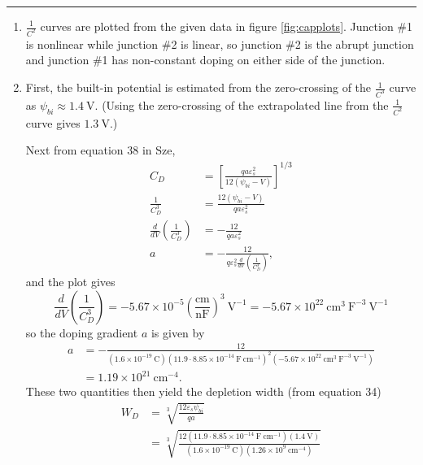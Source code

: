 \documentclass{article}
\newcommand{\horline}
           {\begin{center}
              \noindent\rule{8cm}{0.4pt}
            \end{center}}
\begin{document}
\horline
\begin{enumerate}
  \item{$\frac{1}{C^2}$ curves are plotted from the given data in figure 
        \ref{fig:capplots}. Junction \#1 is nonlinear while junction \#2 is 
        linear, so junction \#2 is the abrupt junction and junction \#1 has 
        non-constant doping on either side of the junction.
       }
  \item{First, the built-in potential is estimated from the zero-crossing of 
the $\frac{1}{C^3}$ curve as $\psi_{bi} \approx 1.4 ~\mathrm{V}.$ 
(Using the zero-crossing of the extrapolated line from the $\frac{1}{C^2}$ 
curve gives $1.3 ~\mathrm{V}$.) 

Next from equation 38 in Sze,
        \begin{align*}
          C_D &= \left[\frac{q a \varepsilon_s^2}{12 (\psi_{bi} - V)}\right]^{1/3} \\
          \frac{1}{C_D^3} &= \frac{12(\psi_{bi} - V)}{q a \varepsilon_s^2} \\
          \frac{d}{dV}\left(\frac{1}{C_D^3}\right) &= -\frac{12}{q a \varepsilon_s^2} \\
          a &= -\frac{12}{q \varepsilon_s^2 \frac{d}{dV}\left(\frac{1}{C_D^3}\right)},
        \end{align*}
        and the plot gives 
        $$
        \frac{d}{dV}\left(\frac{1}{C_D^3}\right) = -5.67 \times 10^{-5} \left(\frac{\mathrm{cm}}{\mathrm{nF}}\right)^3 ~\mathrm{V}^{-1} 
         = -5.67 \times 10^{22} ~\mathrm{cm}^{3}~\mathrm{F}^{-3} ~\mathrm{V}^{-1}
        $$
        so the doping gradient $a$ is given by
        \
\begin{align*}
        a &= -\frac{12}{(1.6 \times 10^{-19} ~\mathrm{C})
                       (11.9 \cdot 8.85 \times 10^{-14} ~\mathrm{F}~\mathrm{cm}^{-1})^2
                       (-5.67 \times 10^{22} ~\mathrm{cm}^3~\mathrm{F}^{-3}~\mathrm{V}^{-1})} \\
          &= 1.19 \times 10^{21} ~\mathrm{cm}^{-4}.
        \end{align*}
        These two quantities then yield the depletion width (from equation 34)
        \begin{align*}
          W_D &= \sqrt[3]{\frac{12 \varepsilon_s \psi_{bi}}{q a}} \\
              &= \sqrt[3]{\frac{12 (11.9 \cdot 8.85 \times 10^{-14} ~\mathrm{F}~\mathrm{cm}^{-1})
                                   (1.4 ~\mathrm{V})}
                               {(1.6 \times 10^{-19} ~\mathrm{C})(1.26 \times 10^{9} ~\mathrm{cm}^{-4})}} \\

\end{align*}}
\end{enumerate}
\end{document}

